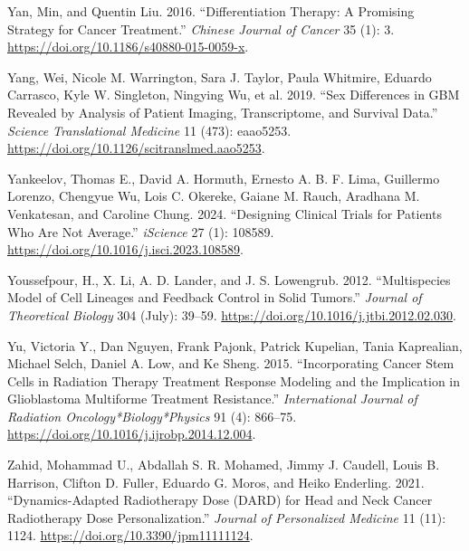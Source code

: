 \documentclass[
  letterpaper,
]{scrreprt}
\newlength{\cslhangindent}
\newenvironment{CSLReferences}[2] %
 {\begin{list}{}{%
  \setlength{\itemindent}{0pt}
  \setlength{\leftmargin}{0pt}
  \setlength{\parsep}{0pt}
  \ifodd #1
   \setlength{\leftmargin}{\cslhangindent}
   \setlength{\itemindent}{-1\cslhangindent}
  \fi
  \setlength{\itemsep}{#2\baselineskip}}}
 {\end{list}}
\theoremstyle{definition}
\theoremstyle{remark}
\begin{document}
\begin{CSLReferences}{1}{0}
Yan, Min, and Quentin Liu. 2016. {``Differentiation Therapy: A Promising
Strategy for Cancer Treatment.''} \emph{Chinese Journal of Cancer} 35
(1): 3. \url{https://doi.org/10.1186/s40880-015-0059-x}.

Yang, Wei, Nicole M. Warrington, Sara J. Taylor, Paula Whitmire, Eduardo
Carrasco, Kyle W. Singleton, Ningying Wu, et al. 2019. {``Sex
Differences in GBM Revealed by Analysis of Patient Imaging,
Transcriptome, and Survival Data.''} \emph{Science Translational
Medicine} 11 (473): eaao5253.
\url{https://doi.org/10.1126/scitranslmed.aao5253}.

Yankeelov, Thomas E., David A. Hormuth, Ernesto A. B. F. Lima, Guillermo
Lorenzo, Chengyue Wu, Lois C. Okereke, Gaiane M. Rauch, Aradhana M.
Venkatesan, and Caroline Chung. 2024. {``Designing Clinical Trials for
Patients Who Are Not Average.''} \emph{iScience} 27 (1): 108589.
\url{https://doi.org/10.1016/j.isci.2023.108589}.

Youssefpour, H., X. Li, A. D. Lander, and J. S. Lowengrub. 2012.
{``Multispecies Model of Cell Lineages and Feedback Control in Solid
Tumors.''} \emph{Journal of Theoretical Biology} 304 (July): 39--59.
\url{https://doi.org/10.1016/j.jtbi.2012.02.030}.

Yu, Victoria Y., Dan Nguyen, Frank Pajonk, Patrick Kupelian, Tania
Kaprealian, Michael Selch, Daniel A. Low, and Ke Sheng. 2015.
{``Incorporating Cancer Stem Cells in Radiation Therapy Treatment
Response Modeling and the Implication in Glioblastoma Multiforme
Treatment Resistance.''} \emph{International Journal of Radiation
Oncology*Biology*Physics} 91 (4): 866--75.
\url{https://doi.org/10.1016/j.ijrobp.2014.12.004}.

Zahid, Mohammad U., Abdallah S. R. Mohamed, Jimmy J. Caudell, Louis B.
Harrison, Clifton D. Fuller, Eduardo G. Moros, and Heiko Enderling.
2021. {``Dynamics-Adapted Radiotherapy Dose (DARD) for Head and Neck
Cancer Radiotherapy Dose Personalization.''} \emph{Journal of
Personalized Medicine} 11 (11): 1124.
\url{https://doi.org/10.3390/jpm11111124}.

\end{CSLReferences}
\end{document}
